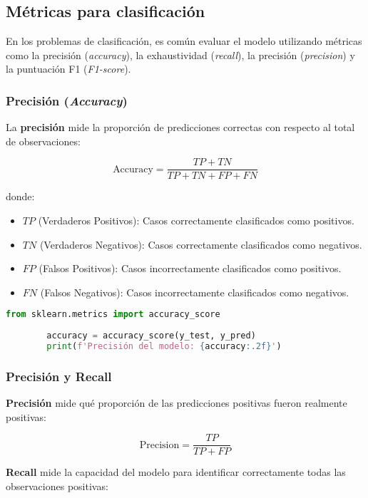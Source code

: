 \documentclass{book}
\begin{document}
	\subsection{Métricas para clasificación}
	
	En los problemas de clasificación, es común evaluar el modelo utilizando métricas como la precisión (\textit{accuracy}), la exhaustividad (\textit{recall}), la precisión (\textit{precision}) y la puntuación F1 (\textit{F1-score}).
	
	\subsubsection{Precisión (\textit{Accuracy})}
	
	La \textbf{precisión} mide la proporción de predicciones correctas con respecto al total de observaciones:
	
	\[
	\text{Accuracy} = \frac{TP + TN}{TP + TN + FP + FN}
	\]
	
	donde:
	\begin{itemize}
		\item \( TP \) (Verdaderos Positivos): Casos correctamente clasificados como positivos.
		\item \( TN \) (Verdaderos Negativos): Casos correctamente clasificados como negativos.
		\item \( FP \) (Falsos Positivos): Casos incorrectamente clasificados como positivos.
		\item \( FN \) (Falsos Negativos): Casos incorrectamente clasificados como negativos.
	\end{itemize}
	
	\begin{lstlisting}[language=Python, caption=Cálculo de precisión en Python]
		from sklearn.metrics import accuracy_score
		
		accuracy = accuracy_score(y_test, y_pred)
		print(f'Precisión del modelo: {accuracy:.2f}')
	\end{lstlisting}
	
	\subsubsection{Precisión y Recall}
	
	\textbf{Precisión} mide qué proporción de las predicciones positivas fueron realmente positivas:
	
	\[
	\text{Precision} = \frac{TP}{TP + FP}
	\]
	
	\textbf{Recall} mide la capacidad del modelo para identificar correctamente todas las observaciones positivas:
	
\end{document}
